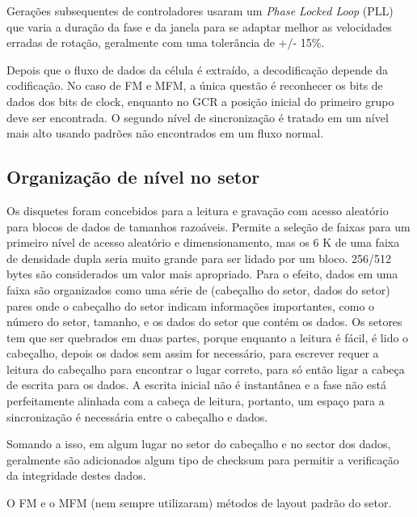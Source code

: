 \documentclass[letterpaper,10pt,brazil]{sphinxmanual}
\begin{document}
Gerações subsequentes de controladores usaram um \emph{Phase Locked Loop}
(PLL) que varia a duração da fase e da janela para se adaptar melhor as
velocidades erradas de rotação, geralmente com uma tolerância de +/-
15\%.

Depois que o fluxo de dados da célula é extraído, a decodificação
depende da codificação. No caso de FM e MFM, a única questão é
reconhecer os bits de dados dos bits de clock, enquanto no GCR a posição
inicial do primeiro grupo deve ser encontrada. O segundo nível de
sincronização é tratado em um nível mais alto usando padrões não
encontrados em um fluxo normal.


\subsection{Organização de nível no setor}
\label{techspecs/floppy:organizacao-de-nivel-no-setor}
Os disquetes foram concebidos para a leitura e gravação com acesso
aleatório para blocos de dados de tamanhos razoáveis. Permite a seleção
de faixas para um primeiro nível de acesso aleatório e dimensionamento,
mas os 6 K de uma faixa de densidade dupla seria muito grande para ser
lidado por um bloco. 256/512 bytes são considerados um valor mais
apropriado. Para o efeito, dados em uma faixa são organizados como uma
série de (cabeçalho do setor, dados do setor) pares onde o cabeçalho do
setor indicam informações importantes, como o número do setor, tamanho,
e os dados do setor que contém os dados. Os setores tem que ser
quebrados em duas partes, porque enquanto a leitura é fácil, é lido o
cabeçalho, depois os dados sem assim for necessário, para escrever
requer a leitura do cabeçalho para encontrar o lugar correto, para só
então ligar a cabeça de escrita para os dados. A escrita inicial não é
instantânea e a fase não está perfeitamente alinhada com a cabeça de
leitura, portanto, um espaço para a sincronização é necessária entre o
cabeçalho e dados.

Somando a isso, em algum lugar no setor do cabeçalho e no sector dos
dados, geralmente são adicionados algum tipo de checksum para permitir
a verificação da integridade destes dados.

O FM e o MFM (nem sempre utilizaram) métodos de layout padrão do setor.
\end{document}

